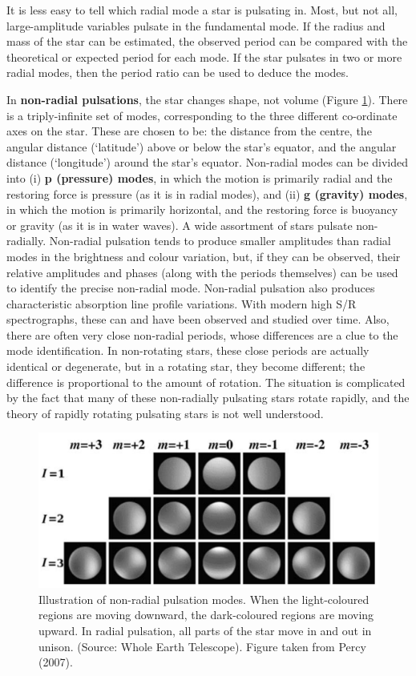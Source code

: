 \documentclass[a4paper,10pt]{article}
\begin{document}
{\noindent}It is less easy to tell which radial mode a star is pulsating in. Most, but not all, large-amplitude variables pulsate in the fundamental mode. If the radius and mass of the star can be estimated, the observed period can be compared with the theoretical or expected period for each mode. If the star pulsates in two or more radial modes, then the period ratio can be used to deduce the modes.

{\noindent}In \textbf{non-radial pulsations}, the star changes shape, not volume (Figure \ref{fig:nonradialpulsations}). There is a triply-infinite set of modes, corresponding to the three different co-ordinate axes on the star. These are chosen to be: the distance from the centre, the angular distance (`latitude') above or below the star's equator, and the angular distance (`longitude') around the star's equator. Non-radial modes can be divided into (i) \textbf{p (pressure) modes}, in which the motion is primarily radial and the restoring force is pressure (as it is in radial modes), and (ii) \textbf{g (gravity) modes}, in which the motion is primarily horizontal, and the restoring force is buoyancy or gravity (as it is in water waves). A wide assortment of stars pulsate non-radially. Non-radial pulsation tends to produce smaller amplitudes than radial modes in the brightness and colour variation, but, if they can be observed, their relative amplitudes and phases (along with the periods themselves) can be used to identify the precise non-radial mode. Non-radial pulsation also produces characteristic absorption line profile variations. With modern high S/R spectrographs, these can and have been observed and studied over time. Also, there are often very close non-radial periods, whose differences are a clue to the mode identification. In non-rotating stars, these close periods are actually identical or degenerate, but in a rotating star, they become different; the difference is proportional to the amount of rotation. The situation is complicated by the fact that many of these non-radially pulsating stars rotate rapidly, and the theory of rapidly rotating pulsating stars is not well understood.

\begin{figure}[t]
    \centering
    \includegraphics[width=14cm]{figures/NonradialPulsations.png}
    \caption{\footnotesize{Illustration of non-radial pulsation modes. When the light-coloured regions are moving downward, the dark-coloured regions are moving upward. In radial pulsation, all parts of the star move in and out in unison. (Source: Whole Earth Telescope). Figure taken from Percy (2007).}}
    \label{fig:nonradialpulsations}
\end{figure}
\end{document}
